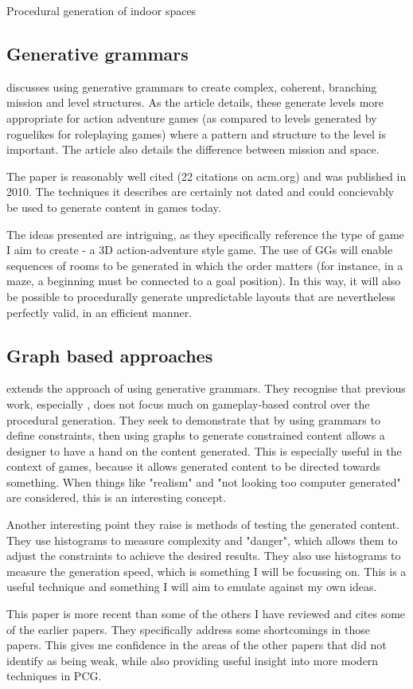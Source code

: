 \documentclass[review]{cmpreport}
\begin{document}
\begin{section}{Procedural generation of indoor spaces}
\subsection{Generative grammars}
\cite{Dormans:2010:ALD:1814256.1814257} discusses using generative grammars to create complex, coherent, branching mission and level structures. As the article details, these generate levels more appropriate for action adventure games (as compared to levels generated by roguelikes for roleplaying games) where a pattern and structure to the level is important. The article also details the difference between mission and space. \par
The paper is reasonably well cited (22 citations on acm.org) and was published in 2010. The techniques it describes are certainly not dated and could concievably be used to generate content in games today. \par  
The ideas presented are intriguing, as they specifically reference the type of game I aim to create - a 3D action-adventure style game. The use of GGs will enable sequences of rooms to be generated in which the order matters (for instance, in a maze, a beginning must be connected to a goal position). In this way, it will also be possible to procedurally generate unpredictable layouts that are nevertheless perfectly valid, in an efficient manner.

\subsection{Graph based approaches}
\cite{van2013designing} extends the approach of using generative grammars. They recognise that previous work, especially \cite{sbpcg}, does not focus much on gameplay-based control over the procedural generation. They seek to demonstrate that by using grammars to define constraints, then using graphs to generate constrained content allows a designer to have a hand on the content generated. This is especially useful in the context of games, because it allows generated content to be directed towards something. When things like "realism" and "not looking too computer generated" are considered, this is an interesting concept. \par
Another interesting point they raise is methods of testing the generated content. They use histograms to measure complexity and "danger", which allows them to adjust the constraints to achieve the desired results. They also use histograms to measure the generation speed, which is something I will be focussing on. This is a useful technique and something I will aim to emulate against my own ideas. \par
This paper is more recent than some of the others I have reviewed and cites some of the earlier papers. They specifically address some shortcomings in those papers. This gives me confidence in the areas of the other papers that did not identify as being weak, while also providing useful insight into more modern techniques in PCG. 

\end{section}
\end{document}
